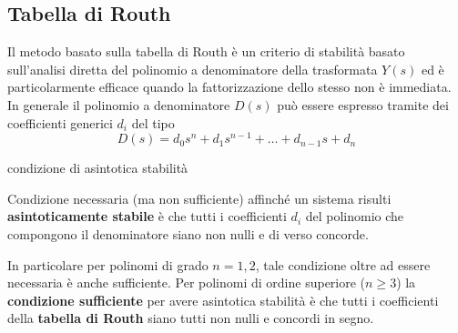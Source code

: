 	\subsection{Tabella di Routh}
		Il metodo basato sulla tabella di Routh è un criterio di stabilità basato sull'analisi diretta del polinomio a denominatore della trasformata $Y(s)$ ed è particolarmente efficace quando la fattorizzazione dello stesso non è immediata. In generale il polinomio a denominatore $D(s)$ può essere espresso tramite dei coefficienti generici $d_i$ del tipo
		\[  D(s) = d_0s^n + d_1 s^{n-1} + \dots + d_{n-1}s + d_n \]
		
		\begin{teorema}{condizione di asintotica stabilità} 
			
			Condizione necessaria (ma non sufficiente) affinché un sistema risulti \textbf{asintoticamente stabile} è che tutti i coefficienti $d_i$ del polinomio che compongono il denominatore siano non nulli e di verso concorde. \label{teor:lti:asintotrouth}
		\end{teorema}
		In particolare per polinomi di grado $n=1,2$, tale condizione oltre ad essere necessaria è anche sufficiente. Per polinomi di ordine superiore ($n\geq 3$) la \textbf{condizione sufficiente} per avere asintotica stabilità è che tutti i coefficienti della \textbf{tabella di Routh} siano tutti non nulli e concordi in segno.
		
